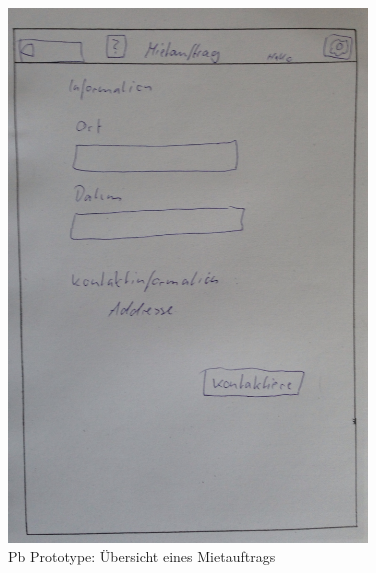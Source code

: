 \begin{figure}[H]
\centering
\includegraphics[angle=90, width=0.85\textwidth]{./images/paperbased/auftrag.JPG}
\caption{Pb Prototype: Übersicht eines Mietauftrags}
\label{pbprototype5}
\end{figure}

